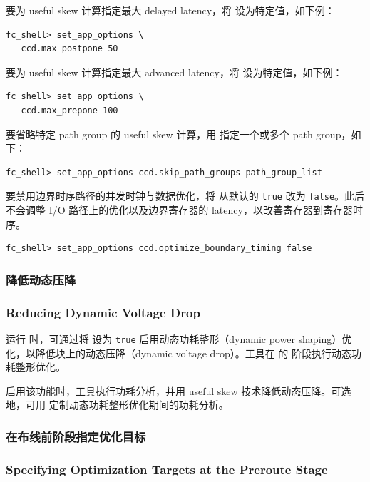 要为 useful skew 计算指定最大 delayed latency，将  设为特定值，如下例：
\begin{lstlisting}
fc_shell> set_app_options \
   ccd.max_postpone 50
\end{lstlisting}

要为 useful skew 计算指定最大 advanced latency，将  设为特定值，如下例：
\begin{lstlisting}
fc_shell> set_app_options \
   ccd.max_prepone 100
\end{lstlisting}

要省略特定 path group 的 useful skew 计算，用  指定一个或多个 path group，如下：
\begin{lstlisting}
fc_shell> set_app_options ccd.skip_path_groups path_group_list
\end{lstlisting}

要禁用边界时序路径的并发时钟与数据优化，将  从默认的 \texttt{true} 改为 \texttt{false}。此后不会调整 I/O 路径上的优化以及边界寄存器的 latency，以改善寄存器到寄存器时序。
\begin{lstlisting}
fc_shell> set_app_options ccd.optimize_boundary_timing false
\end{lstlisting}

\subsubsection{降低动态压降}
\subsubsection*{Reducing Dynamic Voltage Drop}

运行  时，可通过将  设为 \texttt{true} 启用动态功耗整形（dynamic power shaping）优化，以降低块上的动态压降（dynamic voltage drop）。工具在  的  阶段执行动态功耗整形优化。

启用该功能时，工具执行功耗分析，并用 useful skew 技术降低动态压降。可选地，可用 \appopt{ccd.dps.use\_case} 定制动态功耗整形优化期间的功耗分析。

\subsubsection{在布线前阶段指定优化目标}
\subsubsection*{Specifying Optimization Targets at the Preroute Stage}


